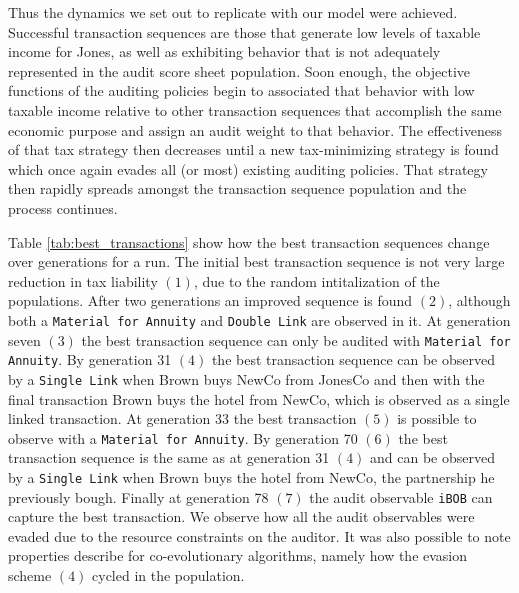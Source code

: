 Thus the dynamics we set out to replicate with our model were
achieved. Successful transaction sequences are those that generate low
levels of taxable income for Jones, as well as exhibiting behavior
that is not adequately represented in the audit score sheet
population. Soon enough, the objective functions of the auditing
policies begin to associated that behavior with low taxable income
relative to other transaction sequences that accomplish the same
economic purpose and assign an audit weight to that behavior. The
effectiveness of that tax strategy then decreases until a new
tax-minimizing strategy is found which once again evades all (or most)
existing auditing policies. That strategy then rapidly spreads amongst
the transaction sequence population and the process continues.

Table \ref{tab:best_transactions} show how the best transaction
sequences change over generations for a run. The initial best
transaction sequence is not very large reduction in tax liability
$(1)$, due to the random intitalization of the populations. After two
generations an improved sequence is found $(2)$, although both a
\texttt{Material for Annuity} and \texttt{Double Link} are observed in
it. At generation seven $(3)$ the best transaction sequence can only
be audited with \texttt{Material for Annuity}. By generation 31 $(4)$
the best transaction sequence can be observed by a \texttt{Single
  Link} when Brown buys NewCo from JonesCo and then with the final
transaction Brown buys the hotel from NewCo, which is observed as a
single linked transaction. At generation 33 the best transaction $(5)$
is possible to observe with a \texttt{Material for Annuity}. By
generation 70 $(6)$ the best transaction sequence is the same as at
generation 31 $(4)$ and can be observed by a \texttt{Single Link} when
Brown buys the hotel from NewCo, the partnership he previously
bough. Finally at generation 78 $(7)$ the audit observable
\texttt{iBOB} can capture the best transaction. We observe how all the
audit observables were evaded due to the resource constraints on the
auditor. It was also possible to note properties describe for
co-evolutionary algorithms, namely how the evasion scheme $(4)$ cycled
in the population.


